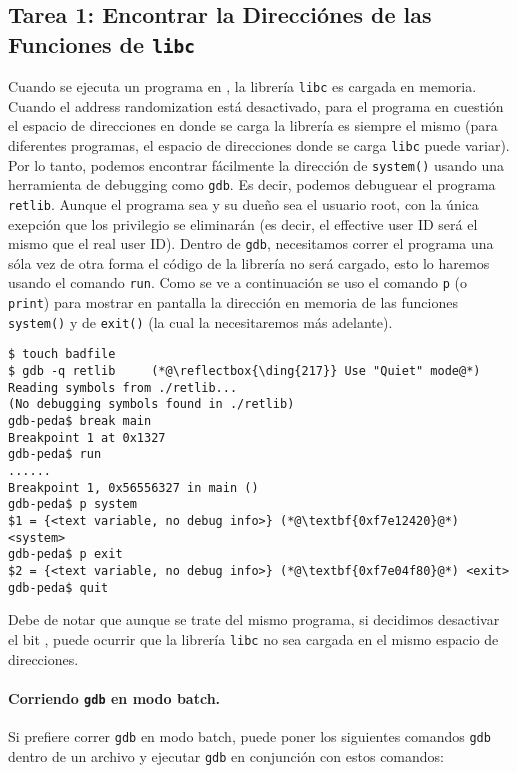 \subsection{Tarea 1: Encontrar la Direcciónes de las Funciones de \texttt{libc} } 

Cuando se ejecuta un programa en \linux, la librería \texttt{libc} es cargada en memoria. Cuando el address randomization está desactivado, para el programa en cuestión el espacio de direcciones en donde se carga la librería es siempre el mismo (para diferentes programas, el espacio de direcciones donde se carga \texttt{libc} puede variar).
Por lo tanto, podemos encontrar fácilmente la dirección de \texttt{system()} usando una herramienta de debugging como \texttt{gdb}. Es decir, podemos debuguear
el programa \texttt{retlib}. Aunque el programa sea \setuid y su dueño sea el usuario root, con la única exepción que los privilegio se eliminarán (es decir, el effective user ID será el mismo que el real user ID).
Dentro de \texttt{gdb}, necesitamos correr el programa una sóla vez de otra forma el código de la librería no será cargado, esto lo haremos usando el comando \texttt{run}.
Como se ve a continuación se uso el comando \texttt{p} (o \texttt{print}) para mostrar en pantalla la dirección en memoria de las funciones \texttt{system()} y de \texttt{exit()} (la cual la necesitaremos más adelante).


\begin{lstlisting}
$ touch badfile
$ gdb -q retlib     (*@\reflectbox{\ding{217}} Use "Quiet" mode@*)
Reading symbols from ./retlib...
(No debugging symbols found in ./retlib)
gdb-peda$ break main
Breakpoint 1 at 0x1327
gdb-peda$ run
......
Breakpoint 1, 0x56556327 in main ()
gdb-peda$ p system
$1 = {<text variable, no debug info>} (*@\textbf{0xf7e12420}@*) <system>
gdb-peda$ p exit
$2 = {<text variable, no debug info>} (*@\textbf{0xf7e04f80}@*) <exit>
gdb-peda$ quit
\end{lstlisting}

Debe de notar que aunque se trate del mismo programa, si decidimos desactivar el bit \setuid, puede ocurrir que la librería \texttt{libc} no sea cargada en el mismo espacio de direcciones.


\paragraph{Corriendo \texttt{gdb} en modo batch.} Si prefiere correr \texttt{gdb} en modo batch, puede poner los siguientes comandos \texttt{gdb} dentro de un archivo y ejecutar \texttt{gdb} en conjunción con estos comandos:


